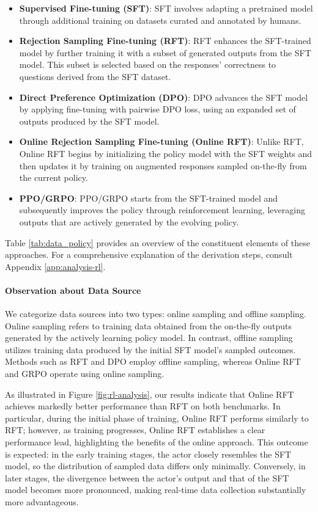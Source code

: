 \begin{itemize}[topsep=0pt]
\begin{itemize}[topsep=0pt]
\begin{itemize}
    \item  \textbf{Supervised Fine-tuning (SFT)}: SFT involves adapting a pretrained model through additional training on datasets curated and annotated by humans.
    \item \textbf{Rejection Sampling Fine-tuning (RFT)}: RFT enhances the SFT-trained model by further training it with a subset of generated outputs from the SFT model. This subset is selected based on the responses' correctness to questions derived from the SFT dataset.
    \item \textbf{Direct Preference Optimization (DPO)}: DPO advances the SFT model by applying fine-tuning with pairwise DPO loss, using an expanded set of outputs produced by the SFT model.
    \item \textbf{Online Rejection Sampling Fine-tuning (Online RFT)}: Unlike RFT, Online RFT begins by initializing the policy model with the SFT weights and then updates it by training on augmented responses sampled on-the-fly from the current policy.
    \item \textbf{PPO/GRPO}: PPO/GRPO starts from the SFT-trained model and subsequently improves the policy through reinforcement learning, leveraging outputs that are actively generated by the evolving policy.
\end{itemize}

Table \ref{tab:data_policy} provides an overview of the constituent elements of these approaches. For a comprehensive explanation of the derivation steps, consult Appendix \ref{app:analysis-rl}.

\paragraph{Observation about Data Source} We categorize data sources into two types: online sampling and offline sampling. Online sampling refers to training data obtained from the on-the-fly outputs generated by the actively learning policy model. In contrast, offline sampling utilizes training data produced by the initial SFT model's sampled outcomes. Methods such as RFT and DPO employ offline sampling, whereas Online RFT and GRPO operate using online sampling.

As illustrated in Figure \ref{fig:rl-analysis}, our results indicate that Online RFT achieves markedly better performance than RFT on both benchmarks. In particular, during the initial phase of training, Online RFT performs similarly to RFT; however, as training progresses, Online RFT establishes a clear performance lead, highlighting the benefits of the online approach. This outcome is expected: in the early training stages, the actor closely resembles the SFT model, so the distribution of sampled data differs only minimally. Conversely, in later stages, the divergence between the actor's output and that of the SFT model becomes more pronounced, making real-time data collection substantially more advantageous.


\end{itemize}
\end{itemize}
